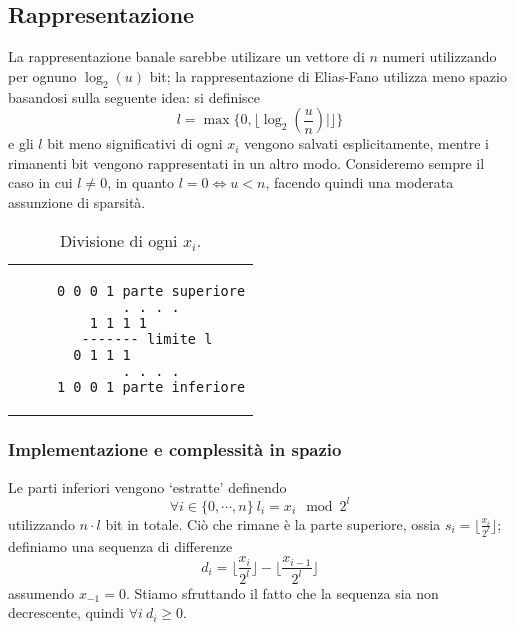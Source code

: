 \subsection{Rappresentazione}
La rappresentazione banale sarebbe utilizare un vettore di $n$ numeri 
utilizzando per ognuno $\log_2(u)$ bit; la rappresentazione di Elias-Fano 
utilizza meno spazio basandosi sulla seguente idea: si definisce 
$$
    l = \max\{0, \lfloor\log_2(\frac{u}{n})|\rfloor\}
$$
e gli $l$ bit meno significativi di ogni $x_i$ vengono salvati 
esplicitamente, mentre i rimanenti bit vengono rappresentati 
in un altro modo. Consideremo sempre il caso in cui $l\neq 0$, in 
quanto $l = 0 \iff u < n$, facendo quindi una moderata 
assunzione di sparsità. 
\begin{table}[h]
    \centering
    \begin{tabular}{c}
    \begin{lstlisting}
	 0 0 0 1 parte superiore
	 . . . .
	 1 1 1 1 		
	 ------- limite l 
	 0 1 1 1 			
	 . . . .
	 1 0 0 1 parte inferiore
    \end{lstlisting}
\end{tabular}
\caption{Divisione di ogni $x_i$.}
\end{table}

\subsubsection{Implementazione e complessità in spazio}
Le parti inferiori vengono `estratte' definendo 
$$
\forall i \in \{0, \cdots, n\} ~ l_i = x_i \mod 2^l 
$$
utilizzando $n \cdot l$ bit in totale.  Ciò che rimane è la parte superiore, ossia 
$s_i = \lfloor{\frac{x_{i}}{2^l}}\rfloor$; definiamo una sequenza di differenze
$$
	d_i = \lfloor{\frac{x_i}{2^l}}\rfloor - \lfloor{\frac{x_{i-1}}{2^l}}\rfloor
$$
assumendo $x_{-1} = 0$. Stiamo sfruttando il fatto che la sequenza sia non 
decrescente, quindi $\forall i ~ d_i \geq 0$. 

